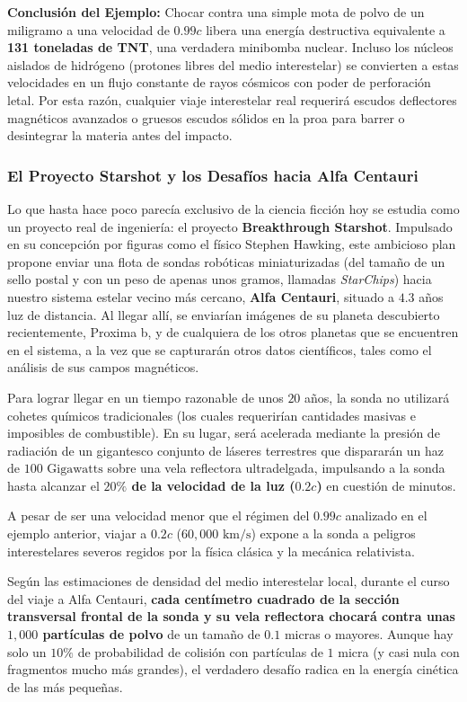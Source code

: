 \documentclass[11pt,a4paper]{book}
\begin{document}
\textbf{Conclusión del Ejemplo:}
Chocar contra una simple mota de polvo de un miligramo a una velocidad de $0.99c$ libera una energía destructiva equivalente a \textbf{131 toneladas de TNT}, una verdadera minibomba nuclear. Incluso los núcleos aislados de hidrógeno (protones libres del medio interestelar) se convierten a estas velocidades en un flujo constante de rayos cósmicos con poder de perforación letal. Por esta razón, cualquier viaje interestelar real requerirá escudos deflectores magnéticos avanzados o gruesos escudos sólidos en la proa para barrer o desintegrar la materia antes del impacto.

\subsubsection{El Proyecto Starshot y los Desafíos hacia Alfa Centauri}

Lo que hasta hace poco parecía exclusivo de la ciencia ficción hoy se estudia como un proyecto real de ingeniería: el proyecto \textbf{Breakthrough Starshot}. Impulsado en su concepción por figuras como el físico Stephen Hawking, este ambicioso plan propone enviar una flota de sondas robóticas miniaturizadas (del tamaño de un sello postal y con un peso de apenas unos gramos, llamadas \textit{StarChips}) hacia nuestro sistema estelar vecino más cercano, \textbf{Alfa Centauri}, situado a $4.3$ años luz de distancia. Al llegar allí, se enviarían imágenes
de su planeta descubierto recientemente, Proxima b, y de cualquiera de los otros planetas que se encuentren en el sistema, a la vez que se capturarán otros datos científicos, tales como el análisis de sus campos magnéticos.

Para lograr llegar en un tiempo razonable de unos $20$ años, la sonda no utilizará cohetes químicos tradicionales (los cuales requerirían cantidades masivas e imposibles de combustible). En su lugar, será acelerada mediante la presión de radiación de un gigantesco conjunto de láseres terrestres que dispararán un haz de $100 \text{ Gigawatts}$ sobre una vela reflectora ultradelgada, impulsando a la sonda hasta alcanzar el \textbf{$20\%$ de la velocidad de la luz ($0.2c$)} en cuestión de minutos.

A pesar de ser una velocidad menor que el régimen del $0.99c$ analizado en el ejemplo anterior, viajar a $0.2c$ ($60,000 \text{ km/s}$) expone a la sonda a peligros interestelares severos regidos por la física clásica y la mecánica relativista.

Según las estimaciones de densidad del medio interestelar local, durante el curso del viaje a Alfa Centauri, \textbf{cada centímetro cuadrado de la sección transversal frontal de la sonda y su vela reflectora chocará contra unas $1,000$ partículas de polvo} de un tamaño de $0.1$ micras o mayores. Aunque hay solo un $10\%$ de probabilidad de colisión con partículas de $1$ micra (y casi nula con fragmentos mucho más grandes), el verdadero desafío radica en la energía cinética de las más pequeñas. 
\end{document}
